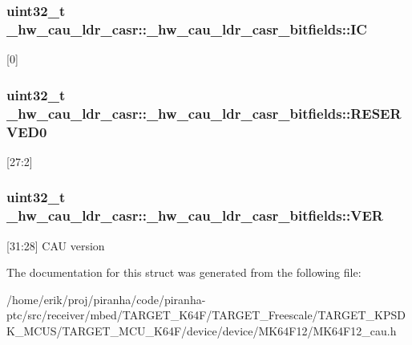 \subsubsection[{\texorpdfstring{IC}{IC}}]{\setlength{\rightskip}{0pt plus 5cm}uint32\+\_\+t \+\_\+hw\+\_\+cau\+\_\+ldr\+\_\+casr\+::\+\_\+hw\+\_\+cau\+\_\+ldr\+\_\+casr\+\_\+bitfields\+::\+IC}\hypertarget{struct__hw__cau__ldr__casr_1_1__hw__cau__ldr__casr__bitfields_aa8c0a2b0adc9d892d1056d3a66f7b8e1}{}\label{struct__hw__cau__ldr__casr_1_1__hw__cau__ldr__casr__bitfields_aa8c0a2b0adc9d892d1056d3a66f7b8e1}
\mbox{[}0\mbox{]} 
\subsubsection[{\texorpdfstring{R\+E\+S\+E\+R\+V\+E\+D0}{RESERVED0}}]{\setlength{\rightskip}{0pt plus 5cm}uint32\+\_\+t \+\_\+hw\+\_\+cau\+\_\+ldr\+\_\+casr\+::\+\_\+hw\+\_\+cau\+\_\+ldr\+\_\+casr\+\_\+bitfields\+::\+R\+E\+S\+E\+R\+V\+E\+D0}\hypertarget{struct__hw__cau__ldr__casr_1_1__hw__cau__ldr__casr__bitfields_ade822da702feb113eac29536061fd5aa}{}\label{struct__hw__cau__ldr__casr_1_1__hw__cau__ldr__casr__bitfields_ade822da702feb113eac29536061fd5aa}
\mbox{[}27\+:2\mbox{]} 
\subsubsection[{\texorpdfstring{V\+ER}{VER}}]{\setlength{\rightskip}{0pt plus 5cm}uint32\+\_\+t \+\_\+hw\+\_\+cau\+\_\+ldr\+\_\+casr\+::\+\_\+hw\+\_\+cau\+\_\+ldr\+\_\+casr\+\_\+bitfields\+::\+V\+ER}\hypertarget{struct__hw__cau__ldr__casr_1_1__hw__cau__ldr__casr__bitfields_ac9de20f20517d942eaf3b88da632478d}{}\label{struct__hw__cau__ldr__casr_1_1__hw__cau__ldr__casr__bitfields_ac9de20f20517d942eaf3b88da632478d}
\mbox{[}31\+:28\mbox{]} C\+AU version 

The documentation for this struct was generated from the following file\+:\begin{DoxyCompactItemize}
\item 
/home/erik/proj/piranha/code/piranha-\/ptc/src/receiver/mbed/\+T\+A\+R\+G\+E\+T\+\_\+\+K64\+F/\+T\+A\+R\+G\+E\+T\+\_\+\+Freescale/\+T\+A\+R\+G\+E\+T\+\_\+\+K\+P\+S\+D\+K\+\_\+\+M\+C\+U\+S/\+T\+A\+R\+G\+E\+T\+\_\+\+M\+C\+U\+\_\+\+K64\+F/device/device/\+M\+K64\+F12/M\+K64\+F12\+\_\+cau.\+h\end{DoxyCompactItemize}

